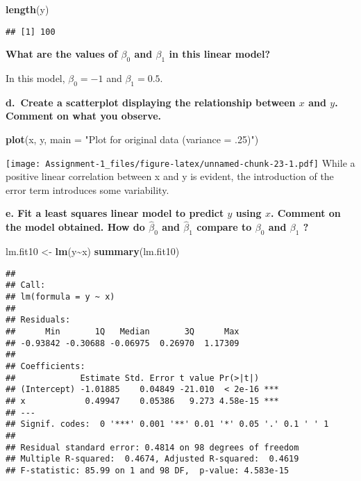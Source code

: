 \documentclass[
]{article}
\newenvironment{Shaded}{\begin{snugshade}}{\end{snugshade}}
\newcommand{\AttributeTok}[1]{\textcolor[rgb]{0.13,0.29,0.53}{#1}}
\newcommand{\FunctionTok}[1]{\textcolor[rgb]{0.13,0.29,0.53}{\textbf{#1}}}
\newcommand{\NormalTok}[1]{#1}
\newcommand{\OtherTok}[1]{\textcolor[rgb]{0.56,0.35,0.01}{#1}}
\newcommand{\SpecialCharTok}[1]{\textcolor[rgb]{0.81,0.36,0.00}{\textbf{#1}}}
\newcommand{\StringTok}[1]{\textcolor[rgb]{0.31,0.60,0.02}{#1}}
\begin{document}
\begin{Shaded}
\begin{Highlighting}[]
\FunctionTok{length}\NormalTok{(y)}
\end{Highlighting}
\end{Shaded}

\begin{verbatim}
## [1] 100
\end{verbatim}

\textbf{What are the values of \(\beta_{0}\) and \(\beta_{1}\) in this
linear model?}

In this model, \(\beta_{0} = -1\) and \(\beta_{1} = 0.5\).

\textbf{d.~Create a scatterplot displaying the relationship between
\(x\) and \(y\). Comment on what you observe.}

\begin{Shaded}
\begin{Highlighting}[]
\FunctionTok{plot}\NormalTok{(x, y, }\AttributeTok{main =} \StringTok{"Plot for original data (variance = .25)"}\NormalTok{)}
\end{Highlighting}
\end{Shaded}

\texttt{[image: Assignment-1\_files/figure-latex/unnamed-chunk-23-1.pdf]}
While a positive linear correlation between x and y is evident, the
introduction of the error term introduces some variability.

\textbf{e. Fit a least squares linear model to predict \(y\) using
\(x\). Comment on the model obtained. How do \(\hat{\beta}_{0}\) and
\(\hat{\beta}_{1}\) compare to \(\beta_{0}\) and \(\beta_{1}\) ?}

\begin{Shaded}
\begin{Highlighting}[]
\NormalTok{lm.fit10 }\OtherTok{\textless{}{-}} \FunctionTok{lm}\NormalTok{(y}\SpecialCharTok{\textasciitilde{}}\NormalTok{x)}
\FunctionTok{summary}\NormalTok{(lm.fit10)}
\end{Highlighting}
\end{Shaded}

\begin{verbatim}
## 
## Call:
## lm(formula = y ~ x)
## 
## Residuals:
##      Min       1Q   Median       3Q      Max 
## -0.93842 -0.30688 -0.06975  0.26970  1.17309 
## 
## Coefficients:
##             Estimate Std. Error t value Pr(>|t|)    
## (Intercept) -1.01885    0.04849 -21.010  < 2e-16 ***
## x            0.49947    0.05386   9.273 4.58e-15 ***
## ---
## Signif. codes:  0 '***' 0.001 '**' 0.01 '*' 0.05 '.' 0.1 ' ' 1
## 
## Residual standard error: 0.4814 on 98 degrees of freedom
## Multiple R-squared:  0.4674, Adjusted R-squared:  0.4619 
## F-statistic: 85.99 on 1 and 98 DF,  p-value: 4.583e-15
\end{verbatim}
\end{document}
